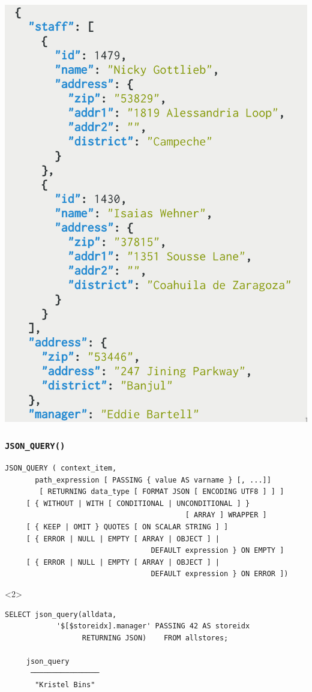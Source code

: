 \begin{frame}
  \includegraphics[height=0.9\textheight,frame]{sampledata.png}
\end{frame}

\begin{frame}[fragile]
  \frametitle{\texttt{JSON\_QUERY()}}

  \begin{lstlisting}
JSON_QUERY ( context_item,
       path_expression [ PASSING { value AS varname } [, ...]]
	    [ RETURNING data_type [ FORMAT JSON [ ENCODING UTF8 ] ] ]
     [ { WITHOUT | WITH [ CONDITIONAL | UNCONDITIONAL ] }
                                          [ ARRAY ] WRAPPER ]
     [ { KEEP | OMIT } QUOTES [ ON SCALAR STRING ] ]
     [ { ERROR | NULL | EMPTY [ ARRAY | OBJECT ] |
                                  DEFAULT expression } ON EMPTY ]
     [ { ERROR | NULL | EMPTY [ ARRAY | OBJECT ] |
                                  DEFAULT expression } ON ERROR ])
  \end{lstlisting}

  \begin{onlyenv}<2>
    \begin{lstlisting}
SELECT json_query(alldata,
            '$[$storeidx].manager' PASSING 42 AS storeidx
                  RETURNING JSON)    FROM allstores;

	 json_query   
      ────────────────
       "Kristel Bins"
    \end{lstlisting}
  \end{onlyenv}

\end{frame}

